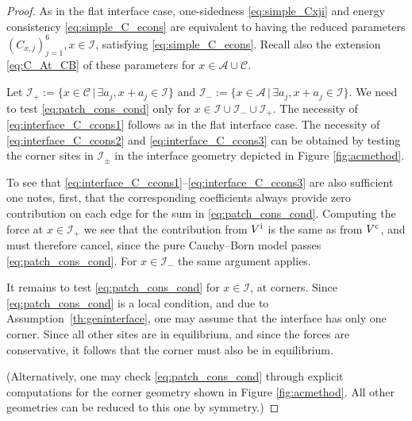 \documentclass[12pt, reqno, a4paper]{amsart}
\numberwithin{equation}{section}
\numberwithin{theorem}{section}
\numberwithin{remark}{section}
\begin{document}
\begin{proof}
  As in the flat interface case, one-sidedness \eqref{eq:simple_Cxji}
  and energy consistency \eqref{eq:simple_C_econs} are equivalent to
  having the reduced parameters $(C_{x,j})_{j = 1}^6, x \in {\mathcal{I}}$,
  satisfying \eqref{eq:simple_C_econs}. Recall also the extension
  \eqref{eq:C_At_CB} of these parameters for $x \in {\mathcal{A}} \cup {\mathcal{C}}$.

  Let ${\mathcal{I}}_+ := \{ x\in{\mathcal{C}} {\,|\,} \exists a_j, x+a_j \in {\mathcal{I}} \}$ and
  ${\mathcal{I}}_- := \{ x\in{\mathcal{A}} {\,|\,} \exists a_j, x+a_j \in {\mathcal{I}} \}$. We need to
  test \eqref{eq:patch_cons_cond} only for $x \in {\mathcal{I}} \cup {\mathcal{I}}_- \cup
  {\mathcal{I}}_+$.  The necessity of \eqref{eq:interface_C_ccons1} follows as
  in the flat interface case. The necessity of
  \eqref{eq:interface_C_ccons2} and \eqref{eq:interface_C_ccons3} can
  be obtained by testing the corner sites in ${\mathcal{I}}_\pm$ in the
  interface geometry depicted in Figure \ref{fig:acmethod}.

  To see that
  \eqref{eq:interface_C_ccons1}--\eqref{eq:interface_C_ccons3} are
  also sufficient one notes, first, that the corresponding
  coefficients always provide zero contribution on each edge for the
  sum in \eqref{eq:patch_cons_cond}. Computing the force at $x \in
  {\mathcal{I}}_+$ we see that the contribution from ${V^{{\rm i}}}$ is the same as from
  ${V^{{\rm c}}}$, and must therefore cancel, since the pure Cauchy--Born model
  passes \eqref{eq:patch_cons_cond}. For $x \in {\mathcal{I}}_-$ the same
  argument applies.

  It remains to test \eqref{eq:patch_cons_cond} for $x \in {\mathcal{I}}$, at
  corners. Since \eqref{eq:patch_cons_cond} is a local condition, and
  due to Assumption~\ref{th:geninterface}, one may assume that the
  interface has only one corner. Since all other sites are in
  equilibrium, and since the forces are conservative, it follows that
  the corner must also be in equilibrium.

  (Alternatively, one may check \eqref{eq:patch_cons_cond} through
  explicit computations for the corner geometry shown in Figure
  \ref{fig:acmethod}. All other geometries can be reduced to this one
  by symmetry.)
    
  
  
  
  
  
  
\end{proof}
\end{document}
